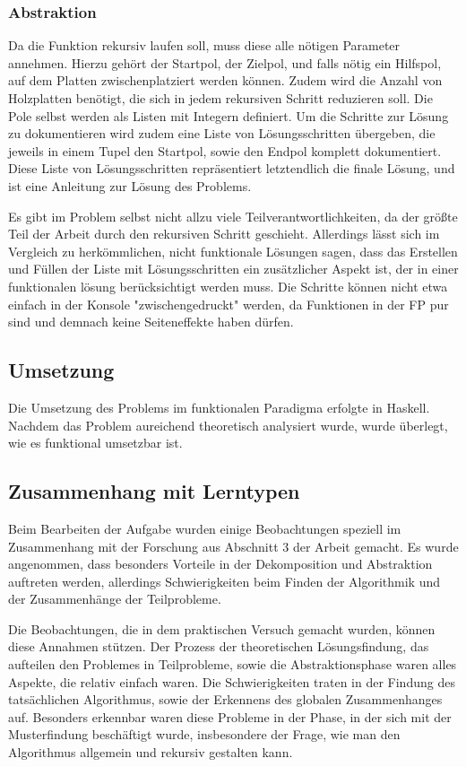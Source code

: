 \subsubsection{Abstraktion}

Da die Funktion rekursiv laufen soll, muss diese alle nötigen Parameter annehmen. Hierzu gehört der Startpol, der Zielpol, und falls nötig ein Hilfspol, auf dem Platten zwischenplatziert werden können. Zudem wird die Anzahl von Holzplatten benötigt, die sich in jedem rekursiven Schritt reduzieren soll. Die Pole selbst werden als Listen mit Integern definiert.
Um die Schritte zur Lösung zu dokumentieren wird zudem eine Liste von Lösungsschritten übergeben, die jeweils in einem Tupel den Startpol, sowie den Endpol komplett dokumentiert. Diese Liste von Lösungsschritten repräsentiert letztendlich die finale Lösung, und ist eine Anleitung zur Lösung des Problems.

Es gibt im Problem selbst nicht allzu viele Teilverantwortlichkeiten, da der größte Teil der Arbeit durch den rekursiven Schritt geschieht. Allerdings lässt sich im Vergleich zu herkömmlichen, nicht funktionale Lösungen sagen, dass das Erstellen und Füllen der Liste mit Lösungsschritten ein zusätzlicher Aspekt ist, der in einer funktionalen lösung berücksichtigt werden muss. Die Schritte können nicht etwa einfach in der Konsole "zwischengedruckt" werden, da Funktionen in der FP pur sind und demnach keine Seiteneffekte haben dürfen.

\subsection{Umsetzung}

Die Umsetzung des Problems im funktionalen Paradigma erfolgte in Haskell. Nachdem das Problem aureichend theoretisch analysiert wurde, wurde überlegt, wie es funktional umsetzbar ist.


\subsection{Zusammenhang mit Lerntypen}
Beim Bearbeiten der Aufgabe wurden einige Beobachtungen speziell im Zusammenhang mit der Forschung aus Abschnitt 3 der Arbeit gemacht. Es wurde angenommen, dass besonders Vorteile in der Dekomposition und Abstraktion auftreten werden, allerdings Schwierigkeiten beim Finden der Algorithmik und der Zusammenhänge der Teilprobleme.

Die Beobachtungen, die in dem praktischen Versuch gemacht wurden, können diese Annahmen stützen. Der Prozess der theoretischen Lösungsfindung, das aufteilen den Problemes in Teilprobleme, sowie die Abstraktionsphase waren alles Aspekte, die relativ einfach waren. Die Schwierigkeiten traten in der Findung des tatsächlichen Algorithmus, sowie der Erkennens des globalen Zusammenhanges auf. Besonders erkennbar waren diese Probleme in der Phase, in der sich mit der Musterfindung beschäftigt wurde, insbesondere der Frage, wie man den Algorithmus allgemein und rekursiv gestalten kann.
